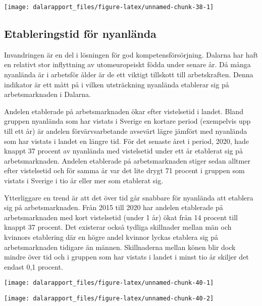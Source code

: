 \documentclass[
]{article}
\begin{document}
\begin{center}\texttt{[image: dalarapport\_files/figure-latex/unnamed-chunk-38-1]} \end{center}

\hypertarget{etableringstid-fuxf6r-nyanluxe4nda}{%
\subsection{Etableringstid för
nyanlända}\label{etableringstid-fuxf6r-nyanluxe4nda}}

Invandringen är en del i lösningen för god kompetensförsörjning. Dalarna
har haft en relativt stor inflyttning av utomeuropeiskt födda under
senare år. Då många nyanlända är i arbetsför ålder är de ett viktigt
tillskott till arbetskraften. Denna indikator är ett mått på i vilken
utsträckning nyanlända etablerar sig på arbetsmarknaden i Dalarna.

Andelen etablerade på arbetsmarknaden ökar efter vistelsetid i landet.
Bland gruppen nyanlända som har vistats i Sverige en kortare period
(exempelvis upp till ett år) är andelen förvärvsarbetande avsevärt lägre
jämfört med nyanlända som har vistats i landet en längre tid. För det
senaste året i period, 2020, hade knappt 37 procent av nyanlända med
vistelsetid under ett år etablerat sig på arbetsmarknaden. Andelen
etablerade på arbetsmarknaden stiger sedan alltmer efter vistelsetid och
för samma år var det lite drygt 71 procent i gruppen som vistats i
Sverige i tio år eller mer som etablerat sig.

Ytterliggare en trend är att det över tid går snabbare för nyanlända att
etablera sig på arbetsmarknaden. Från 2015 till 2020 har andelen
etablerade på arbetsmarknaden med kort vistelsetid (under 1 år) ökat
från 14 procent till knappt 37 procent. Det existerar också tydliga
skillnader mellan män och kvinnors etablering där en högre andel kvinnor
lyckas etablera sig på arbetsmarknaden tidigare än männen. Skillnaderna
mellan könen blir dock mindre över tid och i gruppen som har vistats i
landet i minst tio år skiljer det endast 0,1 procent.

\begin{center}\texttt{[image: dalarapport\_files/figure-latex/unnamed-chunk-40-1]} \end{center}

\begin{center}\texttt{[image: dalarapport\_files/figure-latex/unnamed-chunk-40-2]} \end{center}
\end{document}

